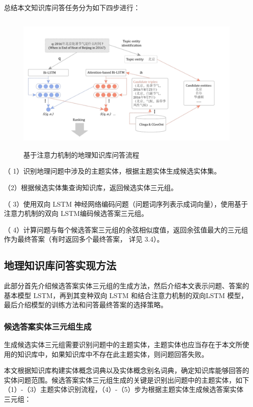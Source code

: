 总结本文知识库问答任务分为如下四步进行：

\begin{figure}[!htb]
	\centering\includegraphics[height=7cm]{resource/qa_overview_1}
	\caption{基于注意力机制的地理知识库问答流程}
	\label{fig:qa_overview}
\end{figure}

（ 1）识别地理问题中涉及的主题实体，根据主题实体生成候选实体集。

（2）根据候选实体集查询知识库，返回候选实体三元组。

（ 3）使用双向 LSTM 神经网络编码问题（问题词序列表示成词向量），使用基于注意力机制的双向 LSTM编码候选答案三元组。

（ 4）计算问题与每个候选答案三元组的余弦相似度值，返回余弦值最大的三元组作为最终答案（有时返回多个最终答案， 详见 3.4）。

\subsection{地理知识库问答实现方法}
此部分首先介绍候选答案实体三元组的生成方法，然后介绍本文表示问题、答案的基本模型 LSTM，再到其变种双向 LSTM 和结合注意力机制的双向LSTM 模型，最后介绍模型的训练方法和问答最终答案的选择策略。

\subsubsection{候选答案实体三元组生成}
生成候选实体三元组需要识别问题中的主题实体，主题实体也应当存在于本文所使用的知识库中，如果知识库中不存在此主题实体，则问题回答失败。

本文根据知识库构建实体概念词典以及实体概念别名词典，确定知识库能够回答的实体问题范围。候选答案实体三元组生成的关键是识别出问题中的主题实体，如下（1）-（3）主题实体识别流程，（4）-（5）步为根据主题实体生成候选答案实体三元组：

